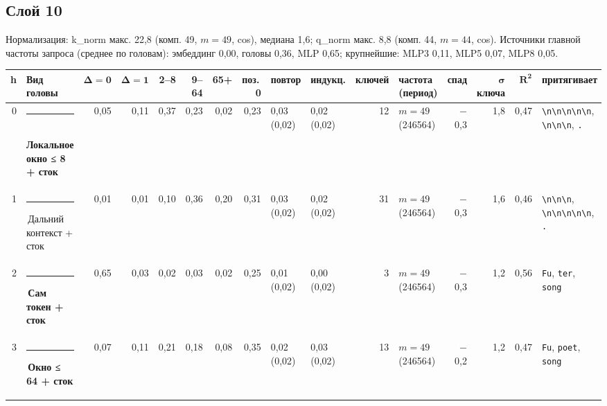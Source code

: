 \documentclass[10pt]{article}
\begin{document}
\noindent\begin{minipage}{\linewidth}
\subsection*{Слой 10}
{\small\color{ink2} Нормализация: k\_norm макс. 22,8 (комп. 49, $m{=}49$, cos), медиана 1,6; q\_norm макс. 8,8 (комп. 44, $m{=}44$, cos). Источники главной частоты запроса (среднее по головам): эмбеддинг 0,00, головы 0,36, MLP 0,65; крупнейшие: MLP3 0,11, MLP5 0,07, MLP8 0,05.}
\begin{center}{\footnotesize\begin{tabular}{|r|l|r|r|r|r|r|r|l|l|r|l|r|r|r|l|}
\hline
\rowcolor{head}\textbf{h} & \textbf{Вид головы} & $\boldsymbol{\Delta{=}0}$ & $\boldsymbol{\Delta{=}1}$ & \textbf{2–8} & \textbf{9–64} & \textbf{65+} & \textbf{поз.\,0} & \textbf{повтор} & \textbf{индукц.} & \textbf{ключей} & \textbf{частота (период)} & \textbf{спад} & $\boldsymbol{\sigma}$ \textbf{ключа} & $\boldsymbol{R^2}$ & \textbf{притягивает} \\ \hline
0 & \textcolor[HTML]{1BAF7A}{\rule{0.62em}{0.62em}}\,\textbf{Локальное окно ≤ 8 + сток} & 0,05 & 0,11 & 0,37 & 0,23 & 0,02 & 0,23 & 0,03 (0,02) & 0,02 (0,02) & 12 & $m{=}49$ (246564) & $-$0,3 & 1,8 & 0,47 & \texttt{\textvisiblespace{}\textbackslash{}n\textbackslash{}n\textbackslash{}n\textbackslash{}n\textbackslash{}n}, \texttt{\textvisiblespace{}\textbackslash{}n\textbackslash{}n\textbackslash{}n}, \texttt{\textvisiblespace{}.} \\ \hline
1 & \textcolor[HTML]{C3C2B7}{\rule{0.62em}{0.62em}}\,Дальний контекст + сток & 0,01 & 0,01 & 0,10 & 0,36 & 0,20 & 0,31 & 0,03 (0,02) & 0,02 (0,02) & 31 & $m{=}49$ (246564) & $-$0,3 & 1,6 & 0,46 & \texttt{\textvisiblespace{}\textbackslash{}n\textbackslash{}n\textbackslash{}n}, \texttt{\textvisiblespace{}\textbackslash{}n\textbackslash{}n\textbackslash{}n\textbackslash{}n\textbackslash{}n}, \texttt{\textvisiblespace{}.} \\ \hline
2 & \textcolor[HTML]{2A78D6}{\rule{0.62em}{0.62em}}\,\textbf{Сам токен + сток} & 0,65 & 0,03 & 0,02 & 0,03 & 0,02 & 0,25 & 0,01 (0,02) & 0,00 (0,02) & 3 & $m{=}49$ (246564) & $-$0,3 & 1,2 & 0,56 & \texttt{\textvisiblespace{}Fu}, \texttt{ter}, \texttt{\textvisiblespace{}song} \\ \hline
3 & \textcolor[HTML]{EDA100}{\rule{0.62em}{0.62em}}\,\textbf{Окно ≤ 64 + сток} & 0,07 & 0,11 & 0,21 & 0,18 & 0,08 & 0,35 & 0,02 (0,02) & 0,03 (0,02) & 13 & $m{=}49$ (246564) & $-$0,2 & 1,2 & 0,47 & \texttt{\textvisiblespace{}Fu}, \texttt{\textvisiblespace{}poet}, \texttt{\textvisiblespace{}song} \\ \hline

\end{tabular}}
\end{center}
\end{minipage}
\end{document}
